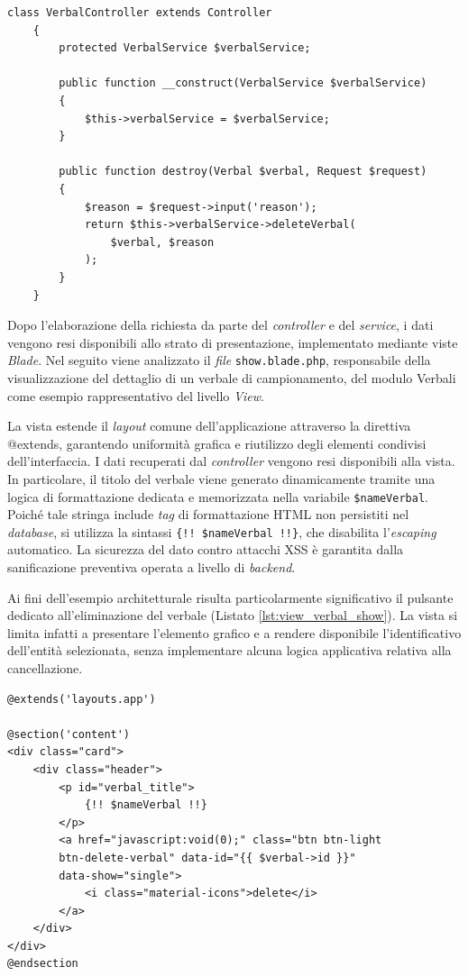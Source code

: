 \begin{lstlisting}[float=!t, caption={Implementazione del Controller con Dependency Injection e azione REST destroy.}, captionpos=b, label={lst:verbal_controller}, basicstyle=\ttfamily\footnotesize]
	class VerbalController extends Controller
	{
		protected VerbalService $verbalService;
		
		public function __construct(VerbalService $verbalService)
		{
			$this->verbalService = $verbalService;
		}
		
		public function destroy(Verbal $verbal, Request $request)
		{
			$reason = $request->input('reason');
			return $this->verbalService->deleteVerbal(
				$verbal, $reason
			);
		}
	}
\end{lstlisting}

Dopo l'elaborazione della richiesta da parte del \textit{controller} e del \textit{service}, i dati vengono resi disponibili allo strato di presentazione, implementato mediante viste \textit{Blade}. Nel seguito viene analizzato il \textit{file} \texttt{show.blade.php}, responsabile della visualizzazione del dettaglio di un verbale di campionamento, del modulo Verbali come esempio rappresentativo del livello \textit{View}.

La vista estende il \textit{layout} comune dell'applicazione attraverso la direttiva @extends, garantendo uniformità grafica e riutilizzo degli elementi condivisi dell'interfaccia. I dati recuperati dal \textit{controller} vengono resi disponibili alla vista. In particolare, il titolo del verbale viene generato dinamicamente tramite una logica di formattazione dedicata e memorizzata nella variabile \texttt{\$nameVerbal}. Poiché tale stringa include \textit{tag} di formattazione HTML non persistiti nel \textit{database}, si utilizza la sintassi \texttt{\{!! \$nameVerbal !!\}}, che disabilita l'\textit{escaping} automatico. La sicurezza del dato contro attacchi XSS è garantita dalla sanificazione preventiva operata a livello di \textit{backend}.

Ai fini dell'esempio architetturale risulta particolarmente significativo il pulsante dedicato all'eliminazione del verbale (Listato \ref{lst:view_verbal_show}). La vista si limita infatti a presentare l'elemento grafico e a rendere disponibile l'identificativo dell'entità selezionata, senza implementare alcuna logica applicativa relativa alla cancellazione.

\begin{lstlisting}[float=!t, caption={Struttura della vista Blade per la visualizzazione del dettaglio del verbale.}, captionpos=b, label={lst:view_verbal_show}, basicstyle=\ttfamily\footnotesize]
@extends('layouts.app')

@section('content')
<div class="card">
	<div class="header">
		<p id="verbal_title">
			{!! $nameVerbal !!}
		</p>
		<a href="javascript:void(0);" class="btn btn-light 
		btn-delete-verbal" data-id="{{ $verbal->id }}" 
		data-show="single">
			<i class="material-icons">delete</i>
		</a>
	</div>
</div>
@endsection
\end{lstlisting}


